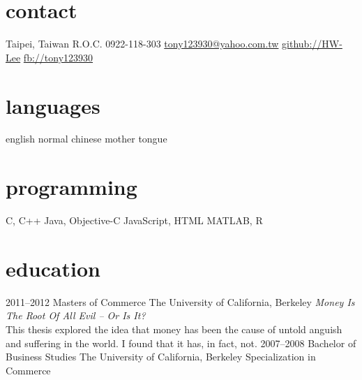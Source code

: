 \documentclass[]{friggeri-cv} %
\begin{document}


\begin{aside} %
	\section{contact}
		Taipei, Taiwan R.O.C.
		0922-118-303		
		\href{mailto:tony123930@yahoo.com.tw}{tony123930@yahoo.com.tw}
		\href{https://github.com/HW-Lee}{github://HW-Lee}
		\href{https://www.facebook.com/tony123930}{fb://tony123930}
	\section{languages}
		english normal
		chinese mother tongue
	\section{programming} 
		C, C++
		Java, Objective-C
		JavaScript, HTML
		MATLAB, R
\end{aside}


\section{education}

	\begin{entrylist}
		\entry
		{2011--2012}
		{Masters {\normalfont of Commerce}}
		{The University of California, Berkeley}
		{\emph{Money Is The Root Of All Evil -- Or Is It?} \\ This thesis explored the idea that money has been the cause of untold anguish and suffering in the world. I found that it has, in fact, not.}
		\entry
		{2007--2008}
		{Bachelor {\normalfont of Business Studies}}
		{The University of California, Berkeley}
		{Specialization in Commerce}
	\end{entrylist}
\end{document}
